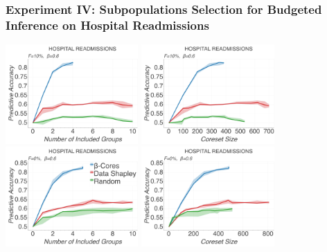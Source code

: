 \documentclass[hyperref={colorlinks = true},unknownkeysallowed]{beamer}
\begin{document}
\begin{frame}
	\frametitle{Experiment IV:  Subpopulations Selection for Budgeted Inference on Hospital Readmissions}
	\centering
	\includegraphics[width=.49\textwidth, height=3.8cm]{figs/group_diabetes06_10_01_False_ACCvsit.png}
	\includegraphics[width=.49\textwidth, height=3.8cm]{figs/group_diabetes06_10_01_False_ACCvssz.png}
	\includegraphics[width=.49\textwidth, height=3.8cm]{figs/group_diabetes06_10_0_False_ACCvsit.png}
	\includegraphics[width=.49\textwidth, height=3.8cm]{figs/group_diabetes06_10_0_False_ACCvssz.png}	
\end{frame}
\end{document}
